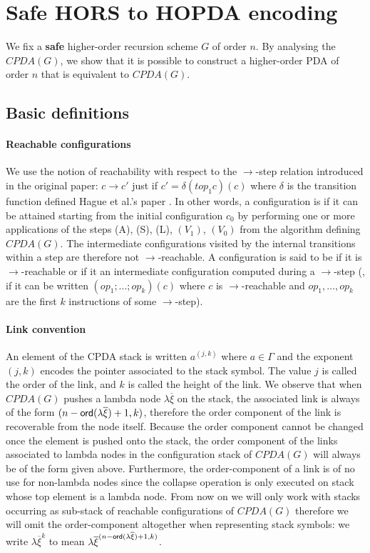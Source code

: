 \documentclass[a4paper]{article}
\theoremstyle{remark}
\theoremstyle{definition}
\begin{document}
\section{Safe HORS to HOPDA encoding}

We fix a {\bf safe} higher-order recursion scheme $G$ of order $n$.
By analysing the $CPDA(G)$, we show that it is possible to construct a higher-order PDA of order $n$ that is equivalent to $CPDA(G)$.


\subsection{Basic definitions}

\paragraph{Reachable configurations}
We use the notion of reachability with respect to the $\rightarrow$-step relation introduced in the original paper:
$c\rightarrow c'$ just if $c' = \delta(top_1 c)(c)$ where $\delta$ is the transition
function defined Hague et al.'s paper \cite[Figure 2]{hague-collaps-full}.
In other words, a configuration is  if it can be attained starting from the initial configuration $c_0$ by performing
one or more applications of the steps (A), (S), (L), $(V_1)$, $(V_0)$ from the algorithm defining $CPDA(G)$.
The intermediate configurations visited by the internal transitions within a step are therefore not $\rightarrow$-reachable.
A configuration is said to be  if it is $\rightarrow$-reachable or if it 
an intermediate configuration computed during a $\rightarrow$-step
(\ie, if it can be written $(op_1;\ldots;op_k)(c)$ where $c$ is $\rightarrow$-reachable and 
$op_1, \ldots, op_k$ are the first $k$ instructions of some $\rightarrow$-step).

\paragraph{Link convention}
An element of the CPDA stack is written $a^{(j,k)}$ where $a\in \Gamma$ and the exponent $(j,k)$
encodes the pointer associated to the stack symbol. The value $j$ is called the order of the link, and $k$ is called the height of the link. We observe that when $CPDA(G)$ pushes 
a lambda node $\lambda \overline{\xi}$ on the stack, the associated link is always of the form $(n-{\sf ord}(\lambda \overline{\xi})+1, k)$, therefore the order component of the link is 
recoverable from the node itself. Because the order component cannot be changed once the element is pushed onto the stack, the order component of the links associated to lambda nodes 
in the configuration stack of $CPDA(G)$ will always be of the form given above.
Furthermore, the order-component of a link is of no use for non-lambda nodes since the collapse operation is only executed on stack whose top element is a lambda node. 
From now on we will only work with stacks occurring as sub-stack of reachable configurations of $CPDA(G)$
therefore we will omit the order-component altogether when representing stack symbols: we write $\lambda \overline{\xi}^{k}$ to mean $\lambda \overline{\xi}^{(n-{\sf ord}(\lambda \overline{\xi})+1,k)}$.
\end{document}
